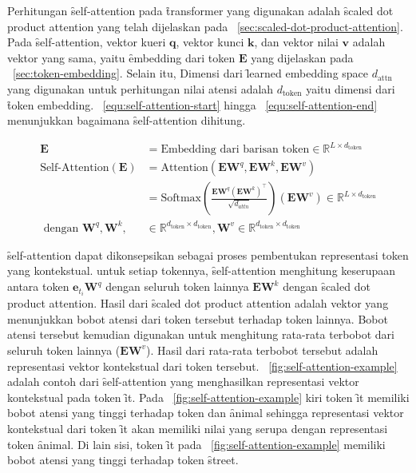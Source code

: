 	Perhitungan \f{self-attention} pada \f{transformer} yang digunakan adalah \f{scaled dot product attention} yang telah dijelaskan pada \sect~\ref{sec:scaled-dot-product-attention}. Pada \f{self-attention}, vektor kueri $\mathbf{q}$, vektor kunci $\mathbf{k}$, dan vektor nilai $\mathbf{v}$ adalah vektor yang sama, yaitu \f{embedding} dari token $\mathbf{E}$ yang dijelaskan pada \sect~\ref{sec:token-embedding}. Selain itu, Dimensi dari \f{learned embedding space} $d_{\text{attn}}$ yang digunakan untuk perhitungan nilai atensi adalah $d_{\text{token}}$ yaitu dimensi dari \f{token embedding}. \equ~\ref{equ:self-attention-start} hingga \equ~\ref{equ:self-attention-end} menunjukkan bagaimana \f{self-attention} dihitung.
	
	
	\begin{align}
		\label{equ:self-attention-start}
		\mathbf{E} &= \text{Embedding dari barisan token} \in \mathbb{R}^{L \times d_{\text{token}}} \\
		\text{Self-Attention}(\mathbf{E}) &= \text{Attention}(\mathbf{EW}^q, \mathbf{EW}^k, \mathbf{EW}^v) \\
		\label{equ:self-attention-end}
		&= \text{Softmax}(\frac{\mathbf{E} \mathbf{W}^q (\mathbf{E} \mathbf{W}^k)^{\top}}{\sqrt{d_{attn}}}) (\mathbf{E} \mathbf{W}^v) \in \mathbb{R}^{L \times d_{\text{token}}} \\
		\text{ dengan } \mathbf{W}^q, \mathbf{W}^k, &\in \mathbb{R}^{d_{\text{token}} \times d_{\text{token}}}, \mathbf{W}^v \in \mathbb{R}^{d_{\text{token}} \times d_{\text{token}}}
	\end{align}

	\f{self-attention} dapat dikonsepsikan sebagai proses pembentukan representasi token yang kontekstual. untuk setiap tokennya, \f{self-attention} menghitung keserupaan antara token $\mathbf{e}_{t_i} \mathbf{W}^q$ dengan seluruh token lainnya $\mathbf{E} \mathbf{W}^k$ dengan \f{scaled dot product attention}. Hasil dari \f{scaled dot product attention} adalah vektor yang menunjukkan bobot atensi dari token tersebut terhadap token lainnya. Bobot atensi tersebut kemudian digunakan untuk menghitung rata-rata terbobot dari seluruh token lainnya ($\mathbf{E} \mathbf{W}^v$). Hasil dari rata-rata terbobot tersebut adalah representasi vektor kontekstual dari token tersebut. \pic~\ref{fig:self-attention-example} adalah contoh dari \f{self-attention} yang menghasilkan representasi vektor kontekstual pada token \f{it}. Pada \pic~\ref{fig:self-attention-example} kiri token \f{it} memiliki bobot atensi yang tinggi terhadap token dan \f{animal} sehingga representasi vektor kontekstual dari token \f{it} akan memiliki nilai yang serupa dengan representasi token \f{animal}. Di lain sisi, token \f{it} pada \pic~\ref{fig:self-attention-example} memiliki bobot atensi yang tinggi terhadap token \f{street}.

